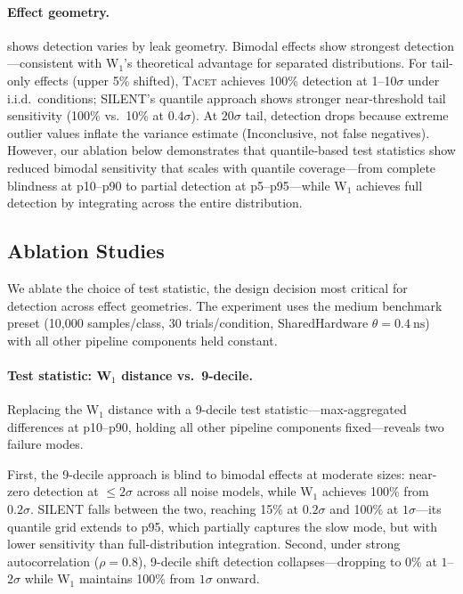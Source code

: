 \documentclass[letterpaper,twocolumn,10pt]{article}
\newcommand{\tacet}{\textsc{Tacet}\xspace}
\newcommand{\silent}{\textsc{SILENT}\xspace}
\newcommand{\ns}[1]{\SI{#1}{\nano\second}}
\begin{document}
\paragraph{Effect geometry.}
 shows detection varies by leak geometry. Bimodal effects
show strongest detection---consistent with W$_1$'s theoretical advantage
for separated distributions. For tail-only effects (upper 5\% shifted),
\tacet achieves 100\% detection at 1--10$\sigma$ under i.i.d.\ conditions;
\silent's quantile approach shows stronger near-threshold tail sensitivity
(100\% vs.\ 10\% at $0.4\sigma$).
At $20\sigma$ tail, detection drops because extreme outlier values inflate the
variance estimate (Inconclusive, not false negatives).
However, our ablation below demonstrates that quantile-based test statistics show
reduced bimodal sensitivity that scales with quantile coverage---from complete
blindness at p10--p90 to partial detection at p5--p95---while W$_1$ achieves full
detection by integrating across the entire distribution.

\subsection{Ablation Studies}
\label{sec:evaluation:ablation}

We ablate the choice of test statistic, the design decision most critical for
detection across effect geometries. The experiment uses the medium benchmark
preset (10{,}000 samples/class, 30 trials/condition, SharedHardware
$\theta = \ns{0.4}$) with all other pipeline components held constant.

\paragraph{Test statistic: W$_1$ distance vs.\ 9-decile.}
Replacing the W$_1$ distance with a 9-decile test statistic---max-aggregated
differences at p10--p90, holding all other pipeline components fixed---reveals
two failure modes.

First, the 9-decile approach is blind to bimodal effects at moderate sizes:
near-zero detection at $\leq 2\sigma$ across all noise models, while W$_1$
achieves 100\% from $0.2\sigma$. \silent falls between the two, reaching 15\%
at $0.2\sigma$ and 100\% at $1\sigma$---its quantile grid extends to p95, which
partially captures the slow mode, but with lower sensitivity than
full-distribution integration. Second, under strong autocorrelation
($\rho = 0.8$), 9-decile shift detection collapses---dropping to 0\% at
$1$--$2\sigma$ while W$_1$ maintains 100\% from $1\sigma$ onward.
\end{document}
